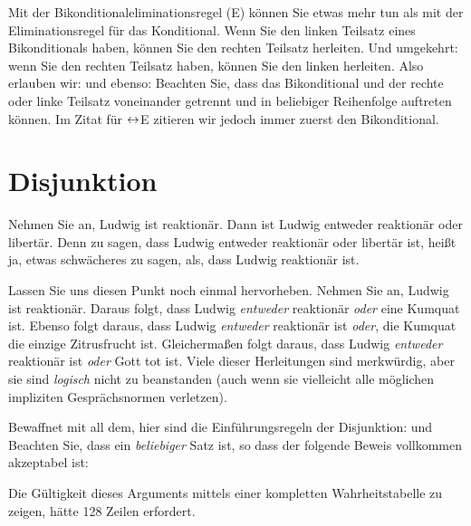 Mit der Bikonditionaleliminationsregel ({\eiff}E) können Sie etwas mehr tun als mit der Eliminationsregel für das Konditional. Wenn Sie den linken Teilsatz eines Bikonditionals haben, können Sie den rechten Teilsatz herleiten. Und umgekehrt: wenn Sie den rechten Teilsatz haben, können Sie den linken herleiten. Also erlauben wir:
und ebenso:
Beachten Sie, dass das Bikonditional und der rechte oder linke Teilsatz voneinander getrennt und in beliebiger Reihenfolge auftreten können. Im Zitat für $\leftrightarrow$E zitieren wir jedoch immer zuerst den Bikonditional.

\section{Disjunktion}
Nehmen Sie an, Ludwig ist reaktionär. Dann ist Ludwig entweder reaktionär oder libertär. Denn zu sagen, dass Ludwig entweder reaktionär oder libertär ist, hei{\ss}t ja, etwas schwächeres zu sagen, als, dass Ludwig reaktionär ist. 

Lassen Sie uns diesen Punkt noch einmal hervorheben. Nehmen Sie an, Ludwig ist reaktionär. Daraus folgt, dass Ludwig \emph{entweder} reaktionär \emph{oder} eine Kumquat ist. Ebenso folgt daraus, dass Ludwig \emph{entweder} reaktionär ist \emph{oder}, die Kumquat die einzige Zitrusfrucht ist.  Gleicherma{\ss}en folgt daraus, dass Ludwig \emph{entweder} reaktionär ist \emph{oder} Gott tot ist. Viele dieser Herleitungen sind merkwürdig, aber sie sind \emph{logisch} nicht zu beanstanden (auch wenn sie vielleicht alle möglichen impliziten Gesprächsnormen verletzen).

Bewaffnet mit all dem, hier sind die Einführungsregeln der Disjunktion:
und
Beachten Sie, dass  ein \emph{beliebiger} Satz ist, so dass der folgende Beweis vollkommen akzeptabel ist:
\begin{fitchproof}
\end{fitchproof}
Die Gültigkeit dieses Arguments mittels einer kompletten Wahrheitstabelle zu zeigen, hätte 128 Zeilen erfordert.

